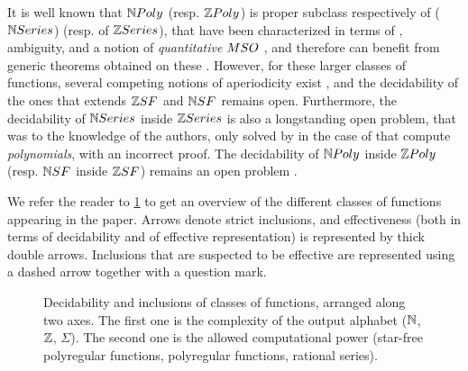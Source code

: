 It is well known that $\NPoly$ (resp. $\ZPoly$) is proper subclass respectively
of  ($\NRat$) (resp. of 
$\ZRat$), that have been characterized in terms of , ambiguity,
and a notion of \emph{quantitative} $\MSO$
\cite{schutzenberger1962,kreutzer2013}, and therefore can benefit from generic
theorems obtained on these \cite{berstel2011noncommutative}. However, for these
larger classes of functions, several competing notions of aperiodicity exist
\cite{droste2019aperiodic,reutenauer_series_1980,LOPEZ23b}, and the
decidability of the ones that extends $\ZSF$ and $\NSF$ remains open.
Furthermore, the decidability of $\NRat$ inside $\ZRat$ is also a longstanding
open problem, that was to the knowledge of the authors, only solved by
\textcite{KARH77} in the case of  that compute
\emph{polynomials}, with an incorrect proof. The decidability of $\NPoly$
inside $\ZPoly$ (resp. $\NSF$ inside $\ZSF$) remains an open problem \cite[Open
question 5.55]{gaetanphd}.

We refer the reader to \cref{previously-known-inclusions:fig} to get an
overview of the different classes of functions appearing in the paper. Arrows
denote strict inclusions, and effectiveness (both in terms of decidability and
of effective representation) is represented by thick double arrows. Inclusions
that are suspected to be effective are represented using a dashed arrow
together with a question mark.


\begin{figure}
    
    \caption{
        Decidability and inclusions of classes of functions,
        arranged along two axes. The first one is the complexity
        of the output alphabet ($\mathbb{N}$, $\mathbb{Z}$, $\Sigma$). The second
        one is the allowed computational power
        (star-free polyregular functions, polyregular functions, 
        rational series).
    }
    \label{previously-known-inclusions:fig}
\end{figure}


